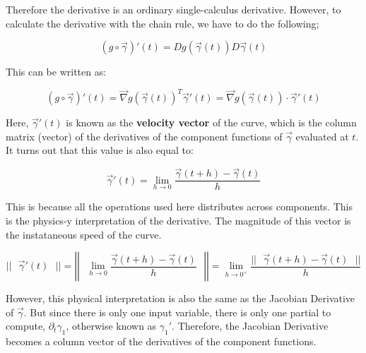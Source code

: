 \documentclass [12 pt, twoside] {book}
\newcommand\+{\text{ }}
\newcommand{\gradient}{\vec{\nabla}}
\begin{document}
Therefore the derivative is an ordinary single-calculus derivative. However, to
calculate the derivative with the chain rule, we have to do the following;

$$(g \circ \vec{\gamma})'(t) = Dg(\vec{\gamma}(t))D\vec{\gamma}(t)$$

This can be written as:

$$(g \circ \vec{\gamma})'(t) = \gradient g(\vec{\gamma}(t))^T \vec{\gamma}'(t) =
\boxed{\gradient g(\vec{\gamma}(t))\cdot\vec{\gamma}'(t)}$$

Here, $\vec{\gamma}'(t)$ is known as the \textbf{velocity vector} of the curve,
which is the column matrix (vector) of the derivatives of the component
functions of $\vec{\gamma}$ evaluated at $t$. It turns out that this value is
also equal to:

$$\vec{\gamma}'(t) = \lim_{h \to 0} \frac{\vec{\gamma}(t + h) -
\vec{\gamma}(t)}{h}$$

This is because all the operations used here distributes across components. This
is the physics-y interpretation of the derivative. The magnitude of this vector
is the instataneous speed of the curve.

$$ ||\+\vec{\gamma}'(t)\+|| = \left|\left|\+\lim_{h \to 0} \frac{\vec{\gamma}(t + h) -
\vec{\gamma}(t)}{h}\+\right|\right| = \lim_{h \to 0^+} \frac{||\+\vec{\gamma}(t + h) -
\vec{\gamma}(t)\+||}{h}$$

However, this physical interpretation is also the same as the Jacobian
Derivative of $\vec{\gamma}$. But since there is only one input variable, there
is only one partial to compute, $\partial_t \gamma_1$, otherwise known as
$\gamma_1'$. Therefore, the Jacobian Derivative becomes a column vector of the
derivatives of the component functions.
%
%
\end{document}
